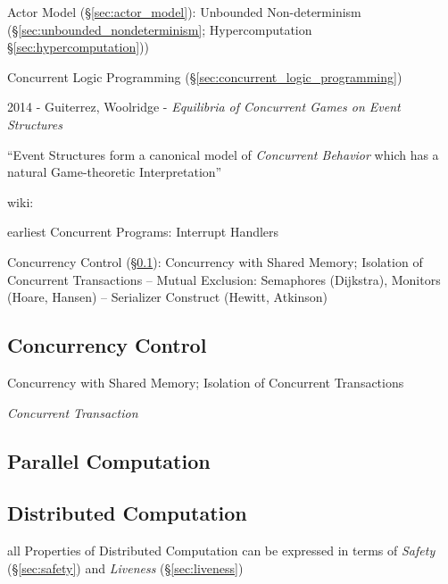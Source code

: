 \fist Actor Model (\S\ref{sec:actor_model}): Unbounded Non-determinism
(\S\ref{sec:unbounded_nondeterminism}; \fist Hypercomputation
\S\ref{sec:hypercomputation}))

\fist Concurrent Logic Programming (\S\ref{sec:concurrent_logic_programming})

2014 - Guiterrez, Woolridge - \emph{Equilibria of Concurrent Games on Event
  Structures}

``Event Structures form a canonical model of \emph{Concurrent Behavior} which
has a natural Game-theoretic Interpretation''

wiki:

earliest Concurrent Programs: Interrupt Handlers %

Concurrency Control (\S\ref{sec:concurrency_control}): Concurrency
with Shared Memory; Isolation of Concurrent Transactions -- Mutual
Exclusion: Semaphores (Dijkstra), Monitors (Hoare, Hansen) --
Serializer Construct (Hewitt, Atkinson)



\subsection{Concurrency Control}\label{sec:concurrency_control}

Concurrency with Shared Memory; Isolation of Concurrent Transactions

\emph{Concurrent Transaction}



\subsection{Parallel Computation}\label{sec:parallel_computation}

\subsection{Distributed Computation}\label{sec:distributed_computation}

all Properties of Distributed Computation can be expressed in terms of
\emph{Safety} (\S\ref{sec:safety}) and \emph{Liveness}
(\S\ref{sec:liveness})

